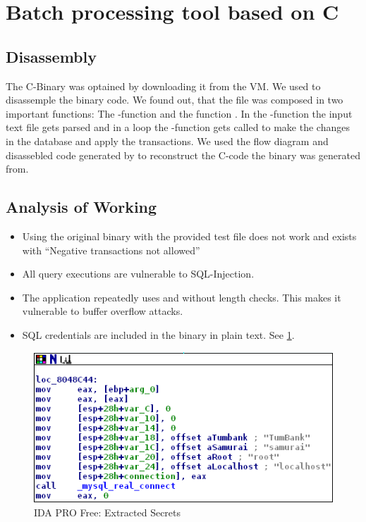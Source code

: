 \section{Batch processing tool based on C}

\subsection{Disassembly}
The C-Binary was optained by downloading it from the VM. We used  to disassemple the binary code.
We found out, that the file was composed in two important functions: The -function and the function . In the -function the input text file gets parsed and in a loop the -function gets called to make the changes in the database and apply the transactions.
We used the flow diagram and disassebled code generated by  to reconstruct the C-code the binary was generated from.

\subsection{Analysis of Working}
\begin{itemize}
\item Using the original binary with the provided test file does not work and exists with \enquote{Negative transactions not allowed}
\item All query executions are vulnerable to SQL-Injection.
\item The application repeatedly uses  and  without length checks. This makes it vulnerable to buffer overflow attacks.
\item SQL credentials are included in the binary in plain text. See \ref{fig:ida_db_info2}.
\end{itemize}

\begin{figure}[ht]
	\centering
	\includegraphics[width=.8\linewidth]{figures/ida_db_info.png}
	\caption{IDA PRO Free: Extracted Secrets}
	\label{fig:ida_db_info2}
\end{figure}